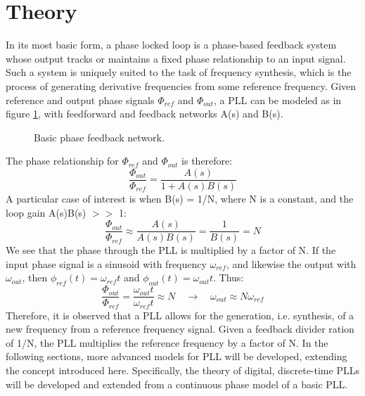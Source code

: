 \section{Theory}\label{theory}
In its most basic form, a phase locked loop is a phase-based feedback system whose output tracks or maintains a fixed phase relationship to an input signal. Such a system is uniquely suited to the task of frequency synthesis, which is the process of generating derivative frequencies from some reference frequency. Given reference and output phase signals $\Phi_{ref}$ and $\Phi_{out}$, a PLL can be modeled as in figure \ref{fig:basic_fb}, with feedforward and feedback networks A(s) and B(s). 
\begin{figure}[htb!]
	\center
	\caption{Basic phase feedback network.}
	\label{fig:basic_fb}
\end{figure}
\FloatBarrier
The phase relationship for $\Phi_{ref}$ and $\Phi_{out}$ is therefore:
\begin{equation}
	\frac{\Phi_{out}}{\Phi_{ref}} = \frac{A(s)}{1+A(s)B(s)}
\end{equation}
A particular case of interest is when B(s) = 1/N, where N is a constant, and the loop gain A(s)B(s) $>>$ 1:
\begin{equation}\label{mult_by_n}
	\frac{\Phi_{out}}{\Phi_{ref}} \approx \frac{A(s)}{A(s)B(s)} = \frac{1}{B(s)} = N
\end{equation}
We see that the phase through the PLL is multiplied by a factor of N. If the input phase signal is a sinusoid with frequency $\omega_{ref}$, and likewise the output with $\omega_{out}$, then $\phi_{ref}(t)=\omega_{ref}t$ and $\phi_{out}(t)=\omega_{out}t$. Thus:
\begin{equation}\label{mult_by_n}
	\frac{\Phi_{out}}{\Phi_{ref}} = \frac{\omega_{out}t}{\omega_{ref}t} \approx N \hspace{1em} \rightarrow \hspace{1em} \omega_{out} \approx N\omega_{ref}
\end{equation}
Therefore, it is observed that a PLL allows for the generation, i.e. synthesis, of a new frequency from a reference frequency signal. Given a feedback divider ration of 1/N, the PLL multiplies the reference frequency by a factor of N. In the following sections, more advanced models for PLL will be developed, extending the concept introduced here. Specifically, the theory of digital, discrete-time PLLs will be developed and extended from a continuous phase model of a basic PLL.

